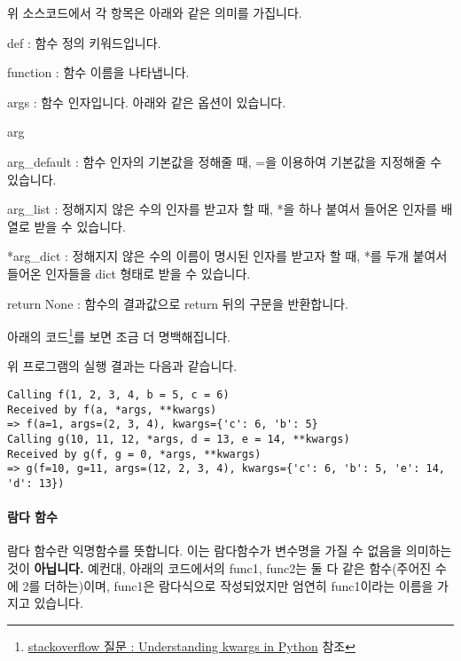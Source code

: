 \documentclass[twoside]{article}
\begin{document}
위 소스코드에서 각 항목은 아래와 같은 의미를 가집니다. 

\begin{compactitem} 
\item def : 함수 정의 키워드입니다. 
\item function : 함수 이름을 나타냅니다. 
\item args : 함수 인자입니다. 아래와 같은 옵션이 있습니다. 
\begin{compactitem} 
\item arg 
\item arg\_default : 함수 인자의 기본값을 정해줄 때, =을 이용하여 기본값을 지정해줄 수 있습니다. 
\item *arg\_list : 정해지지 않은 수의 인자를 받고자 할 때, *을 하나 붙여서 들어온 인자를 배열로 받을 수 있습니다. 
\item **arg\_dict : 정해지지 않은 수의 이름이 명시된 인자를 받고자 할 때, *를 두개 붙여서 들어온 인자들을 dict 형태로 받을 수 있습니다. 
\end{compactitem} 
\item return None : 함수의 결과값으로 return 뒤의 구문을 반환합니다. 
\end{compactitem}


아래의 코드\footnote{\href{https://stackoverflow.com/a/21338152}{stackoverflow 질문 : Understanding kwargs in Python} 참조}를 보면 조금 더 명백해집니다. 


                
위 프로그램의 실행 결과는 다음과 같습니다. 

\begin{lstlisting}[style=stdout, caption = {Output for Function Argmument Options}]
Calling f(1, 2, 3, 4, b = 5, c = 6)
Received by f(a, *args, **kwargs) 
=> f(a=1, args=(2, 3, 4), kwargs={'c': 6, 'b': 5}
Calling g(10, 11, 12, *args, d = 13, e = 14, **kwargs)
Received by g(f, g = 0, *args, **kwargs)
=> g(f=10, g=11, args=(12, 2, 3, 4), kwargs={'c': 6, 'b': 5, 'e': 14, 'd': 13})
\end{lstlisting}

\paragraph{람다 함수}

람다 함수란 익명함수를 뜻합니다. 이는 람다함수가 변수명을 가질 수 없음을 의미하는 것이 \textbf{아닙니다.} 예컨대, 아래의 코드에서의 func1, func2는 둘 다 같은 함수(주어진 수에 2를 더하는)이며, func1은 람다식으로 작성되었지만 엄연히 func1이라는 이름을 가지고 있습니다. 
\end{document}

